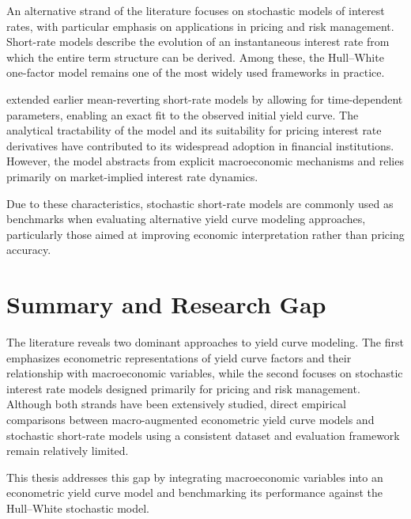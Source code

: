 An alternative strand of the literature focuses on stochastic models of interest rates, with
particular emphasis on applications in pricing and risk management. Short-rate models
describe the evolution of an instantaneous interest rate from which the entire term structure
can be derived. Among these, the Hull--White one-factor model remains one of the most widely
used frameworks in practice.

\textcite{hull_white_1990} extended earlier mean-reverting short-rate models by allowing for
time-dependent parameters, enabling an exact fit to the observed initial yield curve. The
analytical tractability of the model and its suitability for pricing interest rate derivatives
have contributed to its widespread adoption in financial institutions. However, the model
abstracts from explicit macroeconomic mechanisms and relies primarily on market-implied
interest rate dynamics.

Due to these characteristics, stochastic short-rate models are commonly used as benchmarks
when evaluating alternative yield curve modeling approaches, particularly those aimed at
improving economic interpretation rather than pricing accuracy.

\section{Summary and Research Gap}

The literature reveals two dominant approaches to yield curve modeling. The first emphasizes
econometric representations of yield curve factors and their relationship with macroeconomic
variables, while the second focuses on stochastic interest rate models designed primarily for
pricing and risk management. Although both strands have been extensively studied, direct
empirical comparisons between macro-augmented econometric yield curve models and
stochastic short-rate models using a consistent dataset and evaluation framework remain
relatively limited.

This thesis addresses this gap by integrating macroeconomic variables into an econometric
yield curve model and benchmarking its performance against the Hull--White stochastic model.
